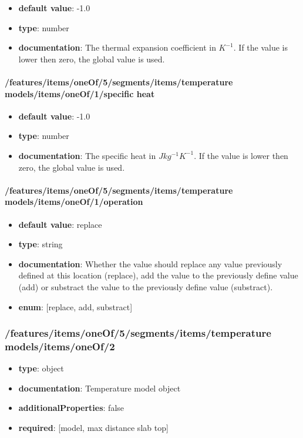 \begin{itemize}\item {\bf default value}: -1.0
\item {\bf type}: number
\item {\bf documentation}: The thermal expansion coefficient in $K^{-1}$. If the value is lower then zero, the global value is used.
\end{itemize}\paragraph{/features/items/oneOf/5/segments/items/temperature models/items/oneOf/1/specific heat}
\begin{itemize}\item {\bf default value}: -1.0
\item {\bf type}: number
\item {\bf documentation}: The specific heat in $J kg^{-1} K^{-1}$. If the value is lower then zero, the global value is used.
\end{itemize}\paragraph{/features/items/oneOf/5/segments/items/temperature models/items/oneOf/1/operation}
\begin{itemize}\item {\bf default value}: replace
\item {\bf type}: string
\item {\bf documentation}: Whether the value should replace any value previously defined at this location (replace), add the value to the previously define value (add) or substract the value to the previously define value (substract).
\item {\bf enum}: [replace, add, substract]\end{itemize}\subsubsection{/features/items/oneOf/5/segments/items/temperature models/items/oneOf/2}
\begin{itemize}\item {\bf type}: object
\item {\bf documentation}: Temperature model object
\item {\bf additionalProperties}: false
\item {\bf required}: [model, max distance slab top]\end{itemize}
